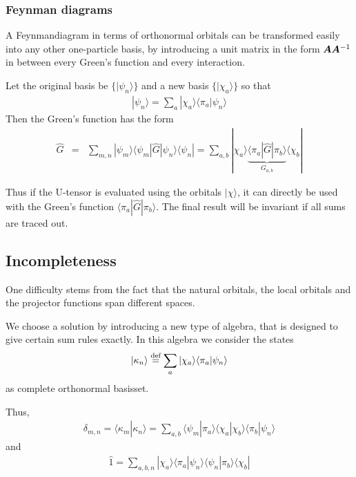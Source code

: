 \documentclass[11pt,a4paper]{report}
\begin{document}
\subsubsection{Feynman diagrams}
A Feynmandiagram in terms of orthonormal orbitals can be transformed
easily into any other one-particle basis, by introducing a unit matrix
in the form $\bm{A}\bm{A}^{-1}$ in between every Green's function
and every interaction. 

Let the original basis be $\{|\psi_n\rangle\}$
and a new basis $\{|\chi_a\rangle\}$ so that
\begin{eqnarray}
|\psi_n\rangle=\sum_a |\chi_a\rangle\langle\pi_a|\psi_n\rangle
\end{eqnarray}
Then the Green's function has the form
\begin{eqnarray}
\hat{G}&=&\sum_{m,n}|\psi_m\rangle
\langle\psi_m|\hat{G}|\psi_n\rangle\langle\psi_n|
=
\sum_{a,b}|\chi_a\rangle
\underbrace{\langle\pi_a|\hat{G}|\pi_b\rangle}_{G_{a,b}}\langle\chi_b|
\end{eqnarray}

Thus if the U-tensor is evaluated using the orbitals $|\chi\rangle$,
it can directly be used with the Green's function
$\langle\pi_a|\hat{G}|\pi_b\rangle$. The final result will be
invariant if all sums are traced out.

\subsection{Incompleteness}
One difficulty stems from the fact that the natural orbitals, the
local orbitals and the projector functions span different spaces.

We choose a solution by introducing a new type of algebra, that is
designed to give certain sum rules exactly. 
In this algebra we consider the states
\begin{eqnarray}
|\kappa_n\rangle\stackrel{\text{def}}{=}
\sum_{a}|\chi_a\rangle\langle\pi_a|\psi_n\rangle
\end{eqnarray}
as complete orthonormal basisset.

Thus, 
\begin{eqnarray}
\delta_{m,n}=\langle\kappa_m|\kappa_n\rangle
=\sum_{a,b}\langle\psi_m|\pi_a\rangle\langle\chi_a|
\chi_b\rangle\langle\pi_b|\psi_n\rangle
\end{eqnarray}
and
\begin{eqnarray}
\hat{1}=\sum_{a,b,n}|\chi_a\rangle\langle\pi_a|\psi_n\rangle
\langle\psi_n|\pi_b\rangle\langle\chi_b|
\end{eqnarray}
\end{document}
